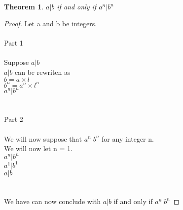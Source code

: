 \documentclass{article}
\newtheorem{thm}{Theorem}[section]
\theoremstyle{definition}
\theoremstyle{remark}
\numberwithin{equation}{section}
\begin{document}
\begin{thm}\label{thm}
$a|b$ if and only if $a^n|b^n$\end{thm}
\begin{proof}
Let a and b be integers.\\\\
Part 1\\ \\
Suppose $a|b$ \\
$a|b$ can be rewriten as
\\ $b=a \times l$
\\ $b^n=a^n \times l^n$\\
$a^n|b^n$\\\\
\\Part 2\\
\\We will now suppose that $a^n|b^n$ for any integer n.
\\We will now let n = 1.\\
$a^n|b^n$\\
$a^1|b^1$\\
$a|b$\\
\\\\
We have can now conclude with $a|b$ if and only if $a^n|b^n$

\end{proof}
 
\end{document}
